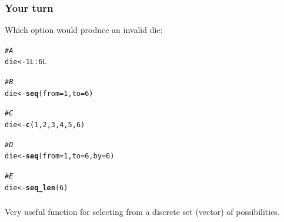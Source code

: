 \documentclass[12pt]{beamer}\usepackage[]{graphicx}\usepackage[]{color}
\makeatletter
\newcommand{\hlnum}[1]{\textcolor[rgb]{0.686,0.059,0.569}{#1}}%
\newcommand{\hlcom}[1]{\textcolor[rgb]{0.678,0.584,0.686}{\textit{#1}}}%
\newcommand{\hlopt}[1]{\textcolor[rgb]{0,0,0}{#1}}%
\newcommand{\hlstd}[1]{\textcolor[rgb]{0.345,0.345,0.345}{#1}}%
\newcommand{\hlkwb}[1]{\textcolor[rgb]{0.69,0.353,0.396}{#1}}%
\newcommand{\hlkwc}[1]{\textcolor[rgb]{0.333,0.667,0.333}{#1}}%
\newcommand{\hlkwd}[1]{\textcolor[rgb]{0.737,0.353,0.396}{\textbf{#1}}}%
\newenvironment{kframe}{%
 \def\at@end@of@kframe{}%
 \ifinner\ifhmode%
  \def\at@end@of@kframe{\end{minipage}}%
  \begin{minipage}{\columnwidth}%
 \fi\fi%
 \def\FrameCommand##1{\hskip\@totalleftmargin \hskip-\fboxsep
 \colorbox{shadecolor}{##1}\hskip-\fboxsep
     \hskip-\linewidth \hskip-\@totalleftmargin \hskip\columnwidth}%
 \MakeFramed {\advance\hsize-\width
   \@totalleftmargin\z@ \linewidth\hsize
   \@setminipage}}%
 {\par\unskip\endMakeFramed%
 \at@end@of@kframe}
\newenvironment{knitrout}{}{} %
\makeatother
\begin{document}
\begin{frame}[fragile]
\frametitle{Your turn}

Which option would produce an invalid die:
\begin{knitrout}\footnotesize
{}\color{fgcolor}\begin{kframe}
\begin{alltt}
\hlcom{# A}
\hlstd{die} \hlkwb{<-} \hlnum{1L}\hlopt{:}\hlnum{6L}

\hlcom{# B}
\hlstd{die} \hlkwb{<-} \hlkwd{seq}\hlstd{(}\hlkwc{from} \hlstd{=} \hlnum{1}\hlstd{,} \hlkwc{to} \hlstd{=} \hlnum{6}\hlstd{)}

\hlcom{# C}
\hlstd{die} \hlkwb{<-} \hlkwd{c}\hlstd{(}\hlnum{1}\hlstd{,} \hlnum{2}\hlstd{,} \hlnum{3}\hlstd{,} \hlnum{4}\hlstd{,} \hlnum{5}\hlstd{,} \hlnum{6}\hlstd{)}

\hlcom{# D}
\hlstd{die} \hlkwb{<-} \hlkwd{seq}\hlstd{(}\hlkwc{from} \hlstd{=} \hlnum{1}\hlstd{,} \hlkwc{to} \hlstd{=} \hlnum{6}\hlstd{,} \hlkwc{by} \hlstd{=} \hlnum{6}\hlstd{)}

\hlcom{# E}
\hlstd{die} \hlkwb{<-} \hlkwd{seq_len}\hlstd{(}\hlnum{6}\hlstd{)}
\end{alltt}
\end{kframe}
\end{knitrout}

\end{frame}


\begin{frame}
\begin{center}
\Large{}
\end{center}
\end{frame}


\begin{frame}[fragile]
\frametitle{}

Very useful function for selecting from a discrete set (vector) of possibilities.

\bi
  \item {}
  \item {}
  \item {}
  \item {}
\ei
\eb

\end{frame}
\end{document}
